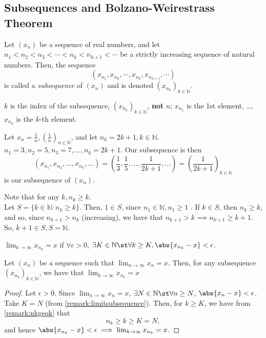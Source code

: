 \documentclass[12pt]{article}
\begin{document}
\subsection{Subsequences and Bolzano-Weirestrass Theorem}

\begin{definition}[Subsequence]
  Let $(x_n)$ be a sequence of real numbers, and let $n_1 < n_2 < n_3 <\cdots < n_k < n_{k+1} < \cdots$ be a strictly increasing sequence of natural numbers. Then, the sequence \[(x_{n_1}, x_{n_2}, \cdots, x_{n_k}, x_{n_{k+1}} , \cdots )\] is called a \emph{subsequence} of $(x_n)$ and is denoted $(x_{n_k})_{k \in \mathbb{N}}$.
\end{definition}

\begin{remark}
  $k$ is the index of the subsequence, $(x_{n_k})_{k\in\mathbb{N}}$, \textbf{not} $n$; $x_{n_1}$ is the 1st element, \dots, $x_{n_k}$ is the $k$-th element.
\end{remark}

\begin{example}
  Let $x_{n} = \frac{1}{n}, (\frac{1}{n})_{n\in\mathbb{N}}$, and let $n_k = 2k+1, k \in \mathbb{N}$. $n_1 =3, n_2 = 5, n_3 = 7, \dots, n_k = 2k+1$. Our subsequence is then \[(x_{n_1}, x_{n_2}, \dots, x_{n_k}, \dots) = \left(\frac{1}{3}, \frac{1}{5}, \dots, \frac{1}{2k+1}, \dots\right) = \left(\frac{1}{2k+1}\right)_{k\in\mathbb{N}}\]is our subsequence of $(x_n)$.
\end{example}

\begin{remark}\label{remark:nkgeqk}
  Note that for any $k, n_{k} \geq k$.\\ Let $S = \{k \in \mathbb{N} : n_k \geq k\}$. Then, $1 \in S$, since $n_1 \in \mathbb{N}, n_1 \geq 1$ . If $k \in S$, then $n_k \geq k$, and so, since $n_{k+1} > n_k$ (increasing), we have that $n_{k+1}> k \implies n_{k+1} \geq k+1$. So, $k+1 \in S, S= \mathbb{N}$.
\end{remark}

\begin{remark}\label{remark:limitsubsequence}
  $\lim_{k\to\infty}x_{n_k} = x$ if $\forall \epsilon > 0$, $\exists K \in \mathbb{N} \st \forall k \geq K, \abs{x_{n_k} - x} < \epsilon$.
\end{remark}


\begin{theorem}\label{thm:convsubsequence}
  Let $(x_n)$ be a sequence such that $\lim_{n\to\infty} x_n = x$. Then, for any subsequence $(x_{n_k})_{k\in\mathbb{N}}$, we have that $\lim_{k\to\infty} x_{n_k} = x$
\end{theorem}
\begin{proof}
  Let $\epsilon > 0$. Since $\lim_{n\to\infty} x_{n} = x$, $\exists N \in \mathbb{N} \st \forall n \geq N$, $\abs{x_n - x} < \epsilon$. Take $K = N$ (from \cref{remark:limitsubsequence}). Then, for $k \geq K$, we have from \cref{remark:nkgeqk} that $$n_k \geq k \geq K = N,$$ and hence $\abs{x_{n_k} - x} < \epsilon \implies \lim_{k\to\infty}x_{n_k} = x$.
\end{proof}
\end{document}
